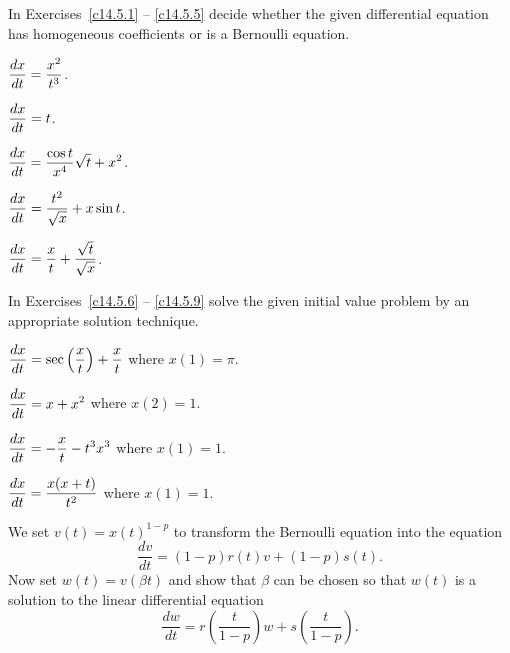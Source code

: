 \documentclass{ximera}
\begin{document}
\EXER

\TEXER

\noindent In Exercises~\ref{c14.5.1} -- \ref{c14.5.5} decide whether the 
given differential equation has homogeneous coefficients or is a Bernoulli 
equation.
\begin{exercise} \label{c14.5.1}
$\displaystyle \frac{dx}{dt} = \frac{x^2}{t^3}$.
\end{exercise}
\begin{exercise} \label{c14.5.2}
$\displaystyle \frac{dx}{dt} = t$.
\end{exercise}
\begin{exercise} \label{c14.5.4}
$\displaystyle \frac{dx}{dt} = \frac{\cos t}{x^4}\sqrt{t}+x^2$.
\end{exercise}
\begin{exercise} \label{c14.5.3}
$\displaystyle \frac{dx}{dt} = \frac{t^2}{\sqrt{x}}+x\sin t$.
\end{exercise}
\begin{exercise} \label{c14.5.5}
$\displaystyle \frac{dx}{dt} = \frac{x}{t} +\frac{\sqrt{t}}{\sqrt{x}}$.
\end{exercise}

\noindent In Exercises~\ref{c14.5.6} -- \ref{c14.5.9} solve the given initial 
value problem by an appropriate solution technique.
\begin{exercise} \label{c14.5.6}
$\displaystyle \frac{dx}{dt} = \sec\left(\frac{x}{t}\right)+\frac{x}{t}$ where
$x(1)=\pi$.
\end{exercise}
\begin{exercise} \label{c14.5.7}
$\displaystyle \frac{dx}{dt} = x+x^2$ where $x(2)=1$.
\end{exercise}
\begin{exercise} \label{c14.5.8}
$\displaystyle \frac{dx}{dt} = -\frac{x}{t}-t^3 x^3$ where $x(1)=1$.
\end{exercise}
\begin{exercise} \label{c14.5.9}
$\displaystyle \frac{dx}{dt} = \frac{x(x+t)}{t^2}$ where $x(1)=1$.
\end{exercise}

\begin{exercise} \label{c14.5.10}
We set $v(t) = x(t)^{1-p}$ to transform the Bernoulli equation 
 into the equation
\[
\frac{dv}{dt} = (1-p) r(t) v + (1-p) s(t).
\]
Now set $w(t) = v(\beta t)$ and show that $\beta$ can be chosen so that 
$w(t)$ is a solution to the linear differential equation
\[
\frac{dw}{dt} = r\left(\frac{t}{1-p}\right) w + s\left(\frac{t}{1-p}\right).
\]
\end{exercise}
\end{document}
